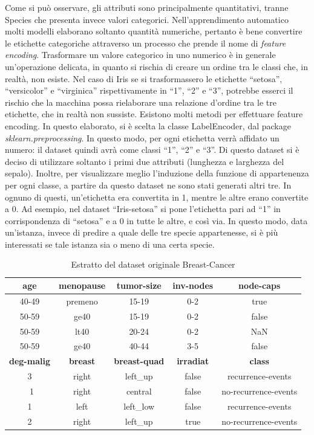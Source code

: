 \documentclass[11pt,  oneside, openany]{book}
\begin{document}
Come si può osservare, gli attributi sono principalmente quantitativi, tranne Species che presenta invece valori categorici. Nell'apprendimento automatico molti modelli elaborano soltanto quantità numeriche, pertanto è bene convertire le etichette categoriche attraverso un processo che prende il nome di \textit{feature encoding}. Trasformare un valore categorico in uno numerico è in generale un'operazione delicata, in quanto si rischia di creare un ordine tra le classi che, in realtà, non esiste. Nel caso di Iris se si trasformassero le etichette  ``setosa'', ``versicolor'' e ``virginica'' rispettivamente in ``1'', ``2'' e ``3'', potrebbe esserci il rischio che la macchina possa rielaborare una relazione d'ordine tra le tre etichette, che in realtà non sussiste. Esistono molti metodi per effettuare feature encoding. In questo elaborato, si è scelta la classe LabelEncoder, dal package \textit{sklearn.preprocessing}. In questo modo, per ogni etichetta verrà affidato un numero: il dataset quindi avrà come classi ``1'', ``2'' e ``3''. Di questo dataset si è deciso di utilizzare soltanto i primi due attributi (lunghezza e larghezza del sepalo). Inoltre, per visualizzare meglio l'induzione della funzione di appartenenza per ogni classe, a partire da questo dataset ne sono stati generati altri tre. In ognuno di questi, un'etichetta era convertita in 1, mentre le altre erano convertite a 0. Ad esempio, nel dataset ``Iris-setosa'' si pone l'etichetta pari ad ``1'' in corrispondenza di ``setosa'' e a 0 in tutte le altre, e così via. 
In questo modo, data un'istanza, invece di predire a quale delle tre specie appartenesse, si è più interessati se tale istanza sia o meno di una certa specie. 


\begin{table} [h!]
    \centering 
    \begin{tabular}{|c|c|c|c|c|}
    \hline
        \textbf{age} & \textbf{menopause} & \textbf{tumor-size} & \textbf{inv-nodes} & \textbf{node-caps} \\ \hline

	40-49		& premeno		& 15-19		&0-2		&true		\\ 		
	50-59		& ge40		& 15-19		&0-2		&false		\\ 
	50-59		& lt40			& 20-24		&0-2		&NaN		\\ 	
	50-59		& ge40		& 40-44		&3-5		&false		\\ \hline \hline
 \textbf{deg-malig} & \textbf{breast} & \textbf{breast-quad} & \textbf{irradiat} & \textbf{class}\\ \hline 
3		&right		&left\_up	&false		&recurrence-events \\ \
1		&right		&central	&false		&no-recurrence-events \\ 
1		&left		&left\_low	&false		&recurrence-events \\ 
2		&right		&left\_up	&true		&no-recurrence-events \\ \hline		
   \end{tabular}
\caption{Estratto del dataset originale Breast-Cancer}
\label{table:4}
\end{table}
\end{document}
